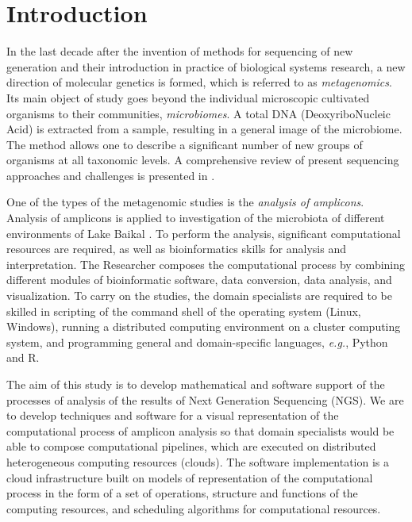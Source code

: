 \documentclass[a4paper]{jpconf}
\begin{document}

\section{Introduction}


In the last decade after the invention of methods for sequencing of new generation and their introduction in practice of biological systems research, a new direction of molecular genetics is formed, which is referred to as \emph{metagenomics}. Its main object of study goes beyond the individual microscopic cultivated organisms to their communities, \emph{microbiomes}. A total DNA (DeoxyriboNucleic Acid) is extracted from a sample, resulting in a general image of the microbiome. The method allows one to describe a significant number of new groups of organisms at all taxonomic levels. A comprehensive review of present sequencing approaches and challenges is presented in \cite{pere20}.

One of the types of the metagenomic studies is the \emph{analysis of amplicons}. Analysis of amplicons is applied to investigation of the microbiota of different environments of Lake Baikal \cite{underice}. To perform the analysis, significant computational resources are required, as well as bioinformatics skills for analysis and interpretation. The Researcher composes the computational process by combining different modules of bioinformatic software, data conversion, data analysis, and visualization. To carry on the studies, the domain specialists are required to be skilled in scripting of the command shell of the operating system (Linux, Windows), running a distributed computing environment on a cluster computing system, and programming general and domain-specific languages, \emph{e.g.}, Python and R.

The aim of this study is to develop mathematical and software support of the processes of analysis of the results of Next Generation Sequencing (NGS). We are to develop techniques and software for a visual representation of the computational process of amplicon analysis so that domain specialists would be able to compose computational pipelines, which are executed on distributed heterogeneous computing resources (clouds). The software implementation is a cloud infrastructure built on models of representation of the computational process in the form of a set of operations, structure and functions of the computing resources, and scheduling algorithms for computational resources.
\end{document}
